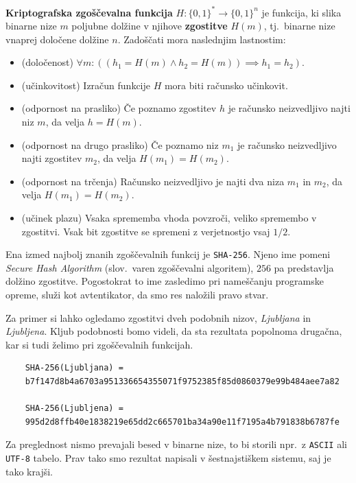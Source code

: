 \documentclass[isrm2, tisk]{fmfdelo}
\begin{document}
\begin{definicija} 
\label{def:hash}
    \textbf{Kriptografska zgoščevalna funkcija} $H: \{0, 1\}^* \rightarrow \{0, 1\}^n$ je funkcija, 
    ki slika binarne nize $m$ poljubne dolžine v njihove \textbf{zgostitve} $H(m)$, tj.\ binarne nize 
    vnaprej določene dolžine $n$. Zadoščati mora naslednjim lastnostim:
    \begin{itemize}
        \item (določenost) $\forall m: ((h_1 = H(m) \wedge h_2 = H(m)) \implies h_1 = h_2)$.
        \item (učinkovitost) Izračun funkcije $H$ mora biti računsko učinkovit.
        \item (odpornost na prasliko) Če poznamo zgostitev $h$ je računsko neizvedljivo najti 
            niz $m$, da velja $h = H(m)$.
        \item (odpornost na drugo prasliko) Če poznamo niz $m_1$ je računsko neizvedljivo najti 
            zgostitev $m_2$, da velja $H(m_1) = H(m_2)$.
        \item (odpornost na trčenja) Računsko neizvedljivo je najti dva niza $m_1$ in $m_2$, 
            da velja $H(m_1) = H(m_2)$.
        \item (učinek plazu) Vsaka sprememba vhoda povzroči, veliko spremembo v zgostitvi. 
            Vsak bit zgostitve se spremeni z verjetnostjo vsaj $1/2$.
    \end{itemize}
\end{definicija}

\begin{primer}
    Ena izmed najbolj znanih zgoščevalnih funkcij je \texttt{SHA-256}. Njeno ime pomeni \textit{Secure 
    Hash Algorithm} (slov.\ varen zgoščevalni algoritem), $256$ pa predstavlja dolžino zgostitve. 
    Pogostokrat to ime zasledimo pri nameščanju programske opreme, služi kot avtentikator, da smo res 
    naložili pravo stvar.

    Za primer si lahko ogledamo zgostitvi dveh podobnih nizov, \textit{Ljubljana} in \textit{Ljubljena}. 
    Kljub podobnosti bomo videli, da sta rezultata popolnoma drugačna, kar si tudi želimo pri zgoščevalnih 
    funkcijah.
    \begin{verbatim}
    SHA-256(Ljubljana) =
    b7f147d8b4a6703a951336654355071f9752385f85d0860379e99b484aee7a82

    SHA-256(Ljubljena) =
    995d2d8ffb40e1838219e65dd2c665701ba34a90e11f7195a4b791838b6787fe
    \end{verbatim}
    Za preglednost nismo prevajali besed v binarne nize, to bi storili npr.\ z \texttt{ASCII} ali \texttt{UTF-8}
    tabelo. Prav tako smo rezultat napisali v šestnajstiškem sistemu, saj je tako krajši.
\end{primer}
\end{document}
